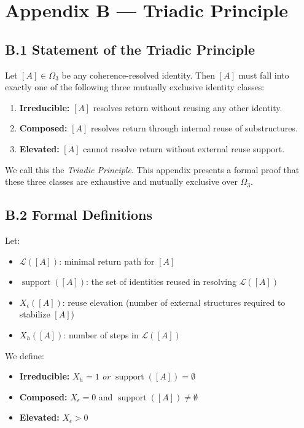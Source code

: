 \appendix
\section*{Appendix B — Triadic Principle}

\subsection*{B.1 \quad Statement of the Triadic Principle}

Let $[A] \in \Omega_3$ be any coherence-resolved identity. Then $[A]$ must fall into exactly one of the following three mutually exclusive identity classes:

\begin{enumerate}
    \item \textbf{Irreducible:} $[A]$ resolves return without reusing any other identity.
    \item \textbf{Composed:} $[A]$ resolves return through internal reuse of substructures.
    \item \textbf{Elevated:} $[A]$ cannot resolve return without external reuse support.
\end{enumerate}

We call this the \textit{Triadic Principle}. This appendix presents a formal proof that these three classes are exhaustive and mutually exclusive over $\Omega_3$.

\subsection*{B.2 \quad Formal Definitions}

Let:
\begin{itemize}
    \item $\mathcal{L}([A])$: minimal return path for $[A]$
    \item $\operatorname{support}([A])$: the set of identities reused in resolving $\mathcal{L}([A])$
    \item $X_\epsilon([A])$: reuse elevation (number of external structures required to stabilize $[A]$)
    \item $X_h([A])$: number of steps in $\mathcal{L}([A])$
\end{itemize}

We define:

\begin{itemize}
    \item \textbf{Irreducible:} $X_h = 1$ \textit{or} $\operatorname{support}([A]) = \emptyset$
    \item \textbf{Composed:} $X_\epsilon = 0$ and $\operatorname{support}([A]) \ne \emptyset$
    \item \textbf{Elevated:} $X_\epsilon > 0$
\end{itemize}

